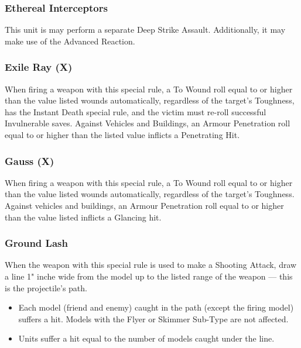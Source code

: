 \begin{multicols}{2}
\subsubsection{Ethereal Interceptors} \label{Ethereal Interceptors}

This unit is may perform a separate Deep Strike Assault. Additionally, it may make use of the  Advanced Reaction.

\subsubsection{Exile Ray (X)} \label{Exile Ray}

When firing a weapon with this special rule, a To Wound roll equal to or higher than the value listed wounds automatically, regardless of the target's Toughness, has the Instant Death special rule, and the victim must re-roll successful Invulnerable saves. Against Vehicles and Buildings, an Armour Penetration roll equal to or higher than the listed value inflicts a Penetrating Hit.

\subsubsection{Gauss (X)} \label{Gauss}

When firing a weapon with this special rule, a To Wound roll equal to or higher than the value listed wounds automatically, regardless of the target’s Toughness. Against vehicles and buildings, an Armour Penetration roll equal to or higher than the value listed inflicts a Glancing hit.

\subsubsection{Ground Lash} \label{Ground Lash}

When the weapon with this special rule is used to make a Shooting Attack, draw a line 1" inche wide from the model up to the listed range of the weapon — this is the projectile's path.

\begin{itemize}
	\item Each model (friend and enemy) caught in the path (except the firing model) suffers a hit. Models with the Flyer or Skimmer Sub-Type are not affected.
	\item Units suffer a hit equal to the number of models caught under the line.
\end{itemize}


\end{multicols}
